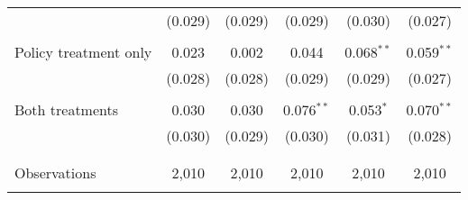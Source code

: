 \begin{tabular}{@{\extracolsep{5pt}}lccccc}
  & (0.029) & (0.029) & (0.029) & (0.030) & (0.027) \\ 
  & & & & & \\ 
 Policy treatment only & 0.023 & 0.002 & 0.044 & 0.068$^{**}$ & 0.059$^{**}$ \\ 
  & (0.028) & (0.028) & (0.029) & (0.029) & (0.027) \\ 
  & & & & & \\ 
 Both treatments & 0.030 & 0.030 & 0.076$^{**}$ & 0.053$^{*}$ & 0.070$^{**}$ \\ 
  & (0.030) & (0.029) & (0.030) & (0.031) & (0.028) \\ 
  & & & & & \\ 
\hline \\[-1.8ex] 

Observations & 2,010 & 2,010 & 2,010 & 2,010 & 2,010 \\ 
\hline 
\hline \\[-1.8ex] 
\end{tabular} 